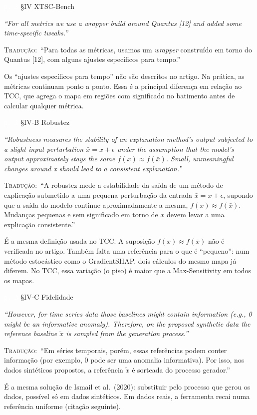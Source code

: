 \documentclass[11pt,a4paper]{article}
\newcommand{\pagechip}[1]{{\setlength{\fboxsep}{1.5pt}\colorbox{cAcc}{\textcolor{white}{\scriptsize\texttt{#1}}}}}
\newenvironment{origquote}{\par\itshape\small}{\par}
\newenvironment{tradquote}{\par\small\textsc{Tradução:}\ }{\par}
\newcommand{\explab}[1]{\par\smallskip{\small\color{cAcc}\textbf{\MakeUppercase{#1}}}\par}
\begin{document}
\begin{citacard}{\pagechip{p. 3} §IV XTSC-Bench}
\begin{origquote}“For all metrics we use a wrapper build around Quantus [12] and added some time-specific tweaks.”\end{origquote}
\begin{tradquote}“Para todas as métricas, usamos um \textit{wrapper} construído em torno do Quantus [12], com alguns ajustes específicos para tempo.”\end{tradquote}
\explab{Explicação}
Os ``ajustes específicos para tempo'' não são descritos no artigo. Na prática, as métricas continuam ponto a ponto. Essa é a principal diferença em relação ao TCC, que agrega o mapa em regiões com significado no batimento antes de calcular qualquer métrica.
\end{citacard}

\begin{citacard}{\pagechip{p. 3} §IV-B Robustez}
\begin{origquote}“Robustness measures the stability of an explanation method’s output subjected to a slight input perturbation $\bar{x} = x + \epsilon$ under the assumption that the model’s output approximately stays the same $f(x) \approx f(\bar{x})$. Small, unmeaningful changes around x should lead to a consistent explanation.”\end{origquote}
\begin{tradquote}“A robustez mede a estabilidade da saída de um método de explicação submetido a uma pequena perturbação da entrada $\bar{x} = x + \epsilon$, supondo que a saída do modelo continue aproximadamente a mesma, $f(x) \approx f(\bar{x})$. Mudanças pequenas e sem significado em torno de $x$ devem levar a uma explicação consistente.”\end{tradquote}
\explab{Explicação}
É a mesma definição usada no TCC. A suposição $f(x) \approx f(\bar{x})$ não é verificada no artigo. Também falta uma referência para o que é ``pequeno'': num método estocástico como o GradientSHAP, dois cálculos do mesmo mapa já diferem. No TCC, essa variação (o piso) é maior que a Max-Sensitivity em todos os mapas.
\end{citacard}

\begin{citacard}{\pagechip{p. 3} §IV-C Fidelidade}
\begin{origquote}“However, for time series data those baselines might contain information (e.g., 0 might be an informative anomaly). Therefore, on the proposed synthetic data the reference baseline $\tilde{x}$ is sampled from the generation process.”\end{origquote}
\begin{tradquote}“Em séries temporais, porém, essas referências podem conter informação (por exemplo, 0 pode ser uma anomalia informativa). Por isso, nos dados sintéticos propostos, a referência $\tilde{x}$ é sorteada do processo gerador.”\end{tradquote}
\explab{Explicação}
É a mesma solução de Ismail et al.\ (2020): substituir pelo processo que gerou os dados, possível só em dados sintéticos. Em dados reais, a ferramenta recai numa referência uniforme (citação seguinte).
\end{citacard}
\end{document}
